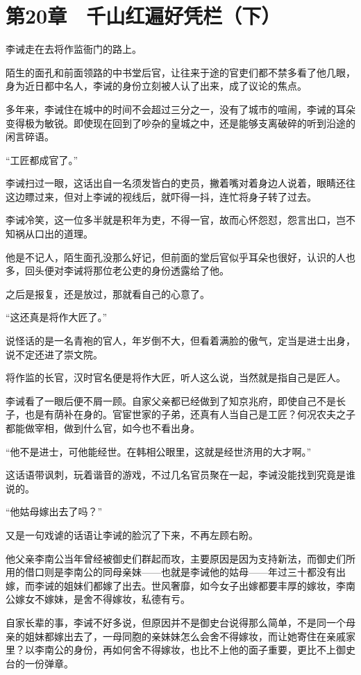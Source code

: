 \section{第20章　千山红遍好凭栏（下）}

李诫走在去将作监衙门的路上。

陌生的面孔和前面领路的中书堂后官，让往来于途的官吏们都不禁多看了他几眼，身为近日都中名人，李诫的身份立刻被人认了出来，成了议论的焦点。

多年来，李诫住在城中的时间不会超过三分之一，没有了城市的喧闹，李诫的耳朵变得极为敏锐。即使现在回到了吵杂的皇城之中，还是能够支离破碎的听到沿途的闲言碎语。

“工匠都成官了。”

李诫扫过一眼，这话出自一名须发皆白的吏员，撇着嘴对着身边人说着，眼睛还往这边瞟过来，但对上李诫的视线后，就吓得一抖，连忙将身子转了过去。

李诫冷笑，这一位多半就是积年为吏，不得一官，故而心怀怨怼，怨言出口，岂不知祸从口出的道理。

他是不记人，陌生面孔没那么好记，但前面的堂后官似乎耳朵也很好，认识的人也多，回头便对李诫将那位老公吏的身份透露给了他。

之后是报复，还是放过，那就看自己的心意了。

“这还真是将作大匠了。”

说怪话的是一名青袍的官人，年岁倒不大，但看着满脸的傲气，定当是进士出身，说不定还进了崇文院。

将作监的长官，汉时官名便是将作大匠，听人这么说，当然就是指自己是匠人。

李诫看了一眼后便不屑一顾。自家父亲都已经做到了知京兆府，即使自己不是长子，也是有荫补在身的。官宦世家的子弟，还真有人当自己是工匠？何况农夫之子都能做宰相，做到什么官，如今也不看出身。

“他不是进士，可他能经世。在韩相公眼里，这就是经世济用的大才啊。”

这话语带讽刺，玩着谐音的游戏，不过几名官员聚在一起，李诫没能找到究竟是谁说的。

“他姑母嫁出去了吗？”

又是一句戏谑的话语让李诫的脸沉了下来，不再左顾右盼。

他父亲李南公当年曾经被御史们群起而攻，主要原因是因为支持新法，而御史们所用的借口则是李南公的同母亲妹——也就是李诫他的姑母——年过三十都没有出嫁，而李诫的姐妹们都嫁了出去。世风奢靡，如今女子出嫁都要丰厚的嫁妆，李南公嫁女不嫁妹，是舍不得嫁妆，私德有亏。

自家长辈的事，李诫不好多说，但原因并不是御史台说得那么简单，不是同一个母亲的姐妹都嫁出去了，一母同胞的亲妹妹怎么会舍不得嫁妆，而让她寄住在亲戚家里？以李南公的身份，再如何舍不得嫁妆，也比不上他的面子重要，更比不上御史台的一份弹章。

